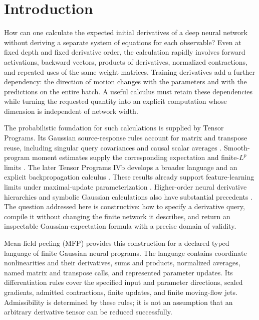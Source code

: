 \section{Introduction}

How can one calculate the expected initial derivatives of a deep neural
network without deriving a separate system of equations for each observable?
Even at fixed depth and fixed derivative order, the calculation rapidly
involves forward activations, backward vectors, products of derivatives,
normalized contractions, and repeated uses of the same weight matrices.
Training derivatives add a further dependency: the direction of motion
changes with the parameters and with the predictions on the entire batch.
A useful calculus must retain these dependencies while turning the requested
quantity into an explicit computation whose dimension is independent of
network width.

The probabilistic foundation for such calculations is supplied by Tensor
Programs. Its Gaussian source-response rules account for matrix and transpose
reuse, including singular query covariances and causal scalar averages
\cite{yang2021tp3}. Smooth-program moment estimates supply the corresponding
expectation and finite-$L^p$ limits \cite{golikov2022nongaus}. The later
Tensor Programs IVb develops a broader language and an explicit
backpropagation calculus \cite{yang2023tp4b}. These results
already support feature-learning limits under maximal-update
parameterization \cite{yang2021tp4}. Higher-order neural derivative
hierarchies and symbolic Gaussian calculations also have substantial
precedents \cite{huang2020nth,chen2020lantk,dyer2019feynman,aitken2020nonlinear}.
The question addressed here is constructive: how to specify a derivative
query, compile it without changing the finite network it describes, and
return an inspectable Gaussian-expectation formula with a precise domain of
validity.

Mean-field peeling (MFP) provides this construction for a declared typed
language of finite Gaussian neural programs. The language contains
coordinate nonlinearities and their derivatives, sums and products,
normalized averages, named matrix and transpose calls, and represented
parameter updates. Its differentiation rules cover the specified input and
parameter directions, scaled gradients, admitted contractions, finite
updates, and finite moving-flow jets. Admissibility is determined by these
rules; it is not an assumption that an arbitrary derivative tensor can be
reduced successfully.

